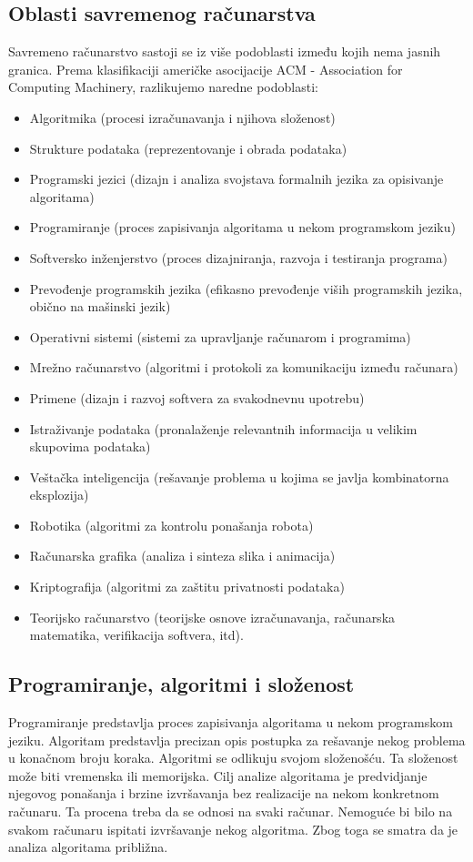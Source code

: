 \documentclass[a4paper]{article}
\begin{document}
{\subsection{Oblasti savremenog računarstva}
Savremeno računarstvo sastoji se iz više podoblasti između kojih nema jasnih granica. Prema klasifikaciji američke asocijacije ACM - Association for Computing Machinery, razlikujemo naredne podoblasti:
\begin{itemize}
\item Algoritmika (procesi izračunavanja i njihova složenost)
\item Strukture podataka (reprezentovanje i obrada podataka)
\item Programski jezici (dizajn i analiza svojstava formalnih jezika za opisivanje
algoritama)
\item Programiranje (proces zapisivanja algoritama u nekom programskom jeziku)
\item Softversko inženjerstvo (proces dizajniranja, razvoja i testiranja programa)
\item Prevođenje programskih jezika (efikasno prevođenje viših programskih jezika,
obično na mašinski jezik)
\item Operativni sistemi (sistemi za upravljanje računarom i programima)
\item Mrežno računarstvo (algoritmi i protokoli za komunikaciju između računara)
\item Primene (dizajn i razvoj softvera za svakodnevnu upotrebu)
\item Istraživanje podataka (pronalaženje relevantnih informacija u velikim skupovima
podataka)
\item Veštačka inteligencija (rešavanje problema u kojima se javlja kombinatorna
eksplozija)
\item Robotika (algoritmi za kontrolu ponašanja robota)
\item Računarska grafika (analiza i sinteza slika i animacija)
\item Kriptografija (algoritmi za zaštitu privatnosti podataka)
\item Teorijsko računarstvo (teorijske osnove izračunavanja, računarska matematika,
verifikacija softvera, itd).
\end{itemize}

\subsection{Programiranje, algoritmi i složenost}
Programiranje predstavlja proces zapisivanja algoritama u nekom programskom jeziku. Algoritam predstavlja precizan opis postupka za rešavanje nekog problema u konačnom broju koraka. Algoritmi se odlikuju svojom složenošću. Ta složenost može biti vremenska ili memorijska. Cilj analize algoritama je predvidjanje njegovog ponašanja i brzine izvršavanja bez realizacije na nekom konkretnom računaru. Ta procena treba da se odnosi na svaki računar. Nemoguće bi bilo na svakom računaru ispitati izvršavanje nekog algoritma. Zbog toga se smatra da je analiza algoritama približna.

}
\end{document}
